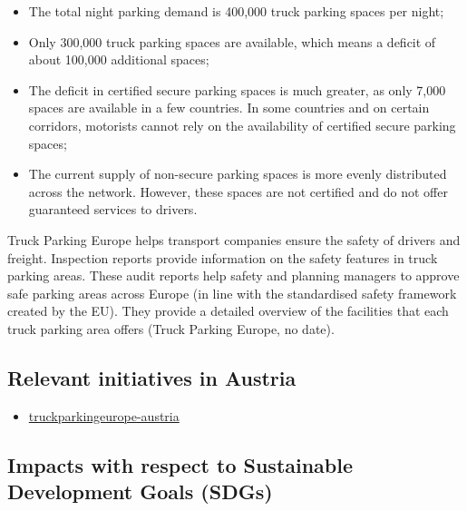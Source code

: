 \documentclass[
]{book}
\providecommand{\tightlist}{%
  \setlength{\itemsep}{0pt}\setlength{\parskip}{0pt}}
\begin{document}
\begin{itemize}
\tightlist
\item
  The total night parking demand is 400,000 truck parking spaces per night;
\item
  Only 300,000 truck parking spaces are available, which means a deficit of about 100,000 additional spaces;
\item
  The deficit in certified secure parking spaces is much greater, as only 7,000 spaces are available in a few countries. In some countries and on certain corridors, motorists cannot rely on the availability of certified secure parking spaces;
\item
  The current supply of non-secure parking spaces is more evenly distributed across the network. However, these spaces are not certified and do not offer guaranteed services to drivers.
\end{itemize}

Truck Parking Europe helps transport companies ensure the safety of drivers and freight. Inspection reports provide information on the safety features in truck parking areas. These audit reports help safety and planning managers to approve safe parking areas across Europe (in line with the standardised safety framework created by the EU). They provide a detailed overview of the facilities that each truck parking area offers (Truck Parking Europe, no date).

\hypertarget{relevant-initiatives-in-austria-17}{%
\subsection*{Relevant initiatives in Austria}\label{relevant-initiatives-in-austria-17}}

\begin{itemize}
\tightlist
\item
  \href{https://www.truckparkingeurope.com/secure-truck-parking-overview/austria/}{truckparkingeurope-austria}
\end{itemize}

\hypertarget{impacts-with-respect-to-sustainable-development-goals-sdgs-17}{%
\subsection*{Impacts with respect to Sustainable Development Goals (SDGs)}\label{impacts-with-respect-to-sustainable-development-goals-sdgs-17}}
\end{document}
